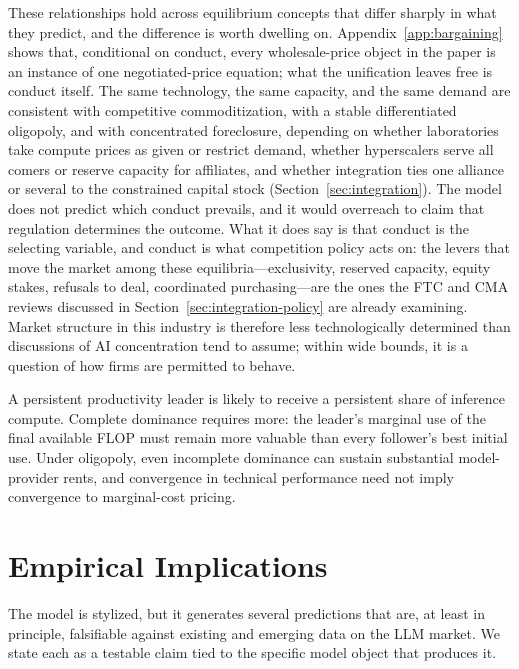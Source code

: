 \documentclass[11pt]{article}
\begin{document}
These relationships hold across equilibrium concepts that differ sharply in what they predict, and the difference is worth dwelling on. Appendix~\ref{app:bargaining} shows that, conditional on conduct, every wholesale-price object in the paper is an instance of one negotiated-price equation; what the unification leaves free is conduct itself. The same technology, the same capacity, and the same demand are consistent with competitive commoditization, with a stable differentiated oligopoly, and with concentrated foreclosure, depending on whether laboratories take compute prices as given or restrict demand, whether hyperscalers serve all comers or reserve capacity for affiliates, and whether integration ties one alliance or several to the constrained capital stock (Section~\ref{sec:integration}). The model does not predict which conduct prevails, and it would overreach to claim that regulation determines the outcome. What it does say is that conduct is the selecting variable, and conduct is what competition policy acts on: the levers that move the market among these equilibria---exclusivity, reserved capacity, equity stakes, refusals to deal, coordinated purchasing---are the ones the FTC and CMA reviews discussed in Section~\ref{sec:integration-policy} are already examining. Market structure in this industry is therefore less technologically determined than discussions of AI concentration tend to assume; within wide bounds, it is a question of how firms are permitted to behave.

A persistent productivity leader is likely to receive a persistent share of inference compute. Complete dominance requires more: the leader's marginal use of the final available FLOP must remain more valuable than every follower's best initial use. Under oligopoly, even incomplete dominance can sustain substantial model-provider rents, and convergence in technical performance need not imply convergence to marginal-cost pricing.

\section{Empirical Implications}
\label{sec:empirical}

The model is stylized, but it generates several predictions that are, at least in principle, falsifiable against existing and emerging data on the LLM market. We state each as a testable claim tied to the specific model object that produces it.
\end{document}
